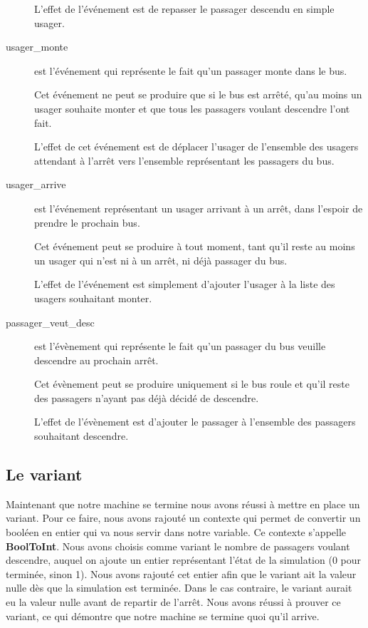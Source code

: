 \documentclass[a4paper,titlepage]{report}
\begin{document}
\begin{description}
			L'effet de l'événement est de repasser le passager descendu en simple usager. \\
			
			\item[usager\_monte] est l'événement qui représente le fait qu'un passager monte dans le bus.
			
			Cet événement ne peut se produire que si le bus est arrêté, qu'au moins un usager souhaite monter et que tous les passagers voulant descendre l'ont fait.
			
			L'effet de cet événement est de déplacer l'usager de l'ensemble des usagers attendant à l'arrêt vers l'ensemble représentant les passagers du bus.\\
		
			\item[usager\_arrive] est l'événement représentant un usager arrivant à un arrêt, dans l'espoir de prendre le prochain bus.
			
			Cet événement peut se produire à tout moment, tant qu'il reste au moins un usager qui n'est ni à un arrêt, ni déjà passager du bus.
			
			L'effet de l'événement est simplement d'ajouter l'usager à la liste des usagers souhaitant monter.\\
			
			\item[passager\_veut\_desc] est l'évènement qui représente le fait qu'un passager du bus veuille descendre au prochain arrêt.
			
			Cet évènement peut se produire uniquement si le bus roule et qu'il reste des passagers n'ayant pas déjà décidé de descendre.
			
			L'effet de l'évènement est d'ajouter le passager à l'ensemble des passagers souhaitant descendre.\\
		\end{description}

	\subsection{Le variant}
		Maintenant que notre machine se termine nous avons réussi à mettre en place un variant. Pour ce faire, nous avons rajouté un contexte qui permet de convertir un booléen en entier qui va nous servir dans notre variable. Ce contexte s'appelle \textbf{BoolToInt}. Nous avons choisis comme variant le nombre de passagers voulant descendre, auquel on ajoute un entier représentant l'état de la simulation (0 pour terminée, sinon 1). Nous avons rajouté cet entier afin que le variant ait la valeur nulle dès que la simulation est terminée. Dans le cas contraire, le variant aurait eu la valeur nulle avant de repartir de l'arrêt. Nous avons réussi à prouver ce variant, ce qui démontre que notre machine se termine quoi qu'il arrive.
		
\end{document}
